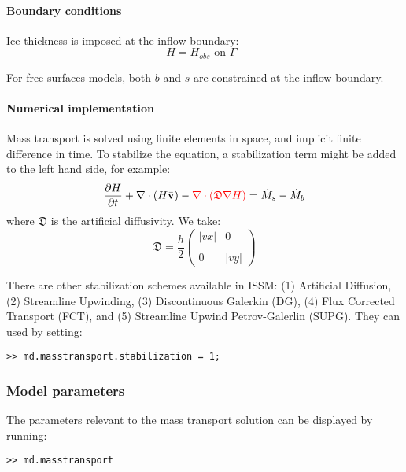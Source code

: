 \paragraph{Boundary conditions}
Ice thickness is imposed at the inflow boundary:
\begin{equation}
	H=H_{obs} \text{ on } \Gamma_{-}
\end{equation}

For free surfaces models, both $b$ and $s$ are constrained at the inflow boundary.

\paragraph{Numerical implementation}
Mass transport is solved using finite elements in space, and implicit finite difference in time. To stabilize the equation, a stabilization term might be added to the left hand side, for example:
\begin{equation}
	\frac{\partial H}{\partial t} + \nabla \cdot \left(H \bar{\bf v}\right) 
	- {\color{red} \nabla \cdot \left(\mathfrak{D} \nabla H\right)}
	= \dot{M}_s - \dot{M}_b
\end{equation}
where $\mathfrak{D}$ is the artificial diffusivity. We take:
\begin{equation}
	\mathfrak{D} = \frac{h}{2}
	\left(\begin{array}{cc}
		\left|vx\right| & 0 \\
		\\
		0 & \left|vy\right|
	\end{array}\right)
\end{equation}

There are other stabilization schemes available in ISSM: (1) Artificial Diffusion, (2) Streamline Upwinding, (3) Discontinuous Galerkin (DG), (4) Flux Corrected Transport (FCT), and (5) Streamline Upwind Petrov-Galerlin (SUPG). They can used by setting:
\begin{lstlisting}
>> md.masstransport.stabilization = 1;
\end{lstlisting}

\subsubsection{Model parameters}
The parameters relevant to the mass transport solution can be displayed by running:
\begin{lstlisting}
>> md.masstransport
\end{lstlisting}

